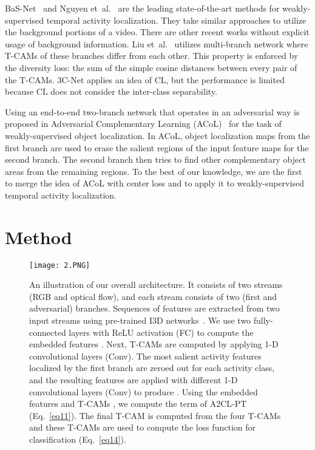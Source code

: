 \documentclass[runningheads]{llncs}
\newcommand{\etal}{et~al.}
\newcommand{\tcam}{\mbox{T-CAM}}
\newcommand{\ourlossname}{\mbox{A2CL-PT}}
\newcommand{\clossname}{\mbox{CL}}
\begin{document}
\mbox{BaS-Net}~\cite{lee2020background} and Nguyen \etal{}~\cite{nguyen2019weakly} are the leading state-of-the-art methods for weakly-supervised temporal activity localization. They take similar approaches to utilize the background portions of a video. There are other recent works without explicit usage of background information. Liu \etal{}~\cite{liu2019completeness} utilizes multi-branch network where \tcam{}s of these branches differ from each other. This property is enforced by the diversity loss: the sum of the simple cosine distances between every pair of the \tcam{}s. 3C-Net applies an idea of \clossname{}, but the performance is limited because \clossname{} does not consider the inter-class separability.

Using an end-to-end two-branch network that operates in an adversarial way is proposed in Adversarial Complementary Learning (ACoL)~\cite{zhang2018adversarial} for the task of weakly-supervised object localization. In ACoL, object localization maps from the first branch are used to erase the salient regions of the input feature maps for the second branch. The second branch then tries to find other complementary object areas from the remaining regions. To the best of our knowledge, we are the first to merge the idea of ACoL with center loss and to apply it to weakly-supervised temporal activity localization.

\section{Method}

\begin{figure}[t]
  \centering
  \texttt{[image: 2.PNG]}
  \caption{An illustration of our overall architecture. It consists of two streams (RGB and optical flow), and each stream consists of two (first and adversarial) branches. Sequences of features are extracted from two input streams using pre-trained I3D networks~\cite{carreira2017quo}. We use two fully-connected layers with ReLU activation (FC) to compute the embedded features . Next, \tcam{}s  are computed by applying 1-D convolutional layers (Conv). The most salient activity features localized by the first branch are zeroed out for each activity class, and the resulting features are applied with different 1-D convolutional layers (Conv) to produce . Using the embedded features  and \tcam{}s , we compute the term of \ourlossname{} (Eq.~\ref{eq11}). The final \tcam{}  is computed from the four \tcam{}s and these \tcam{}s are used to compute the loss function for classification (Eq.~\ref{eq14}).}
  \label{fig2}
\end{figure}
\end{document}

